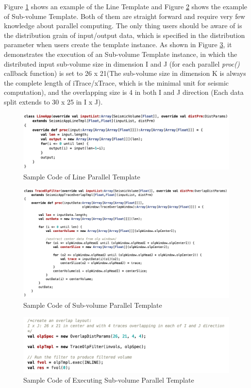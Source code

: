 Figure \ref{code_tmpl_line} shows an example of the Line Template and Figure \ref{code_tmpl_subv} shows the example of Sub-volume Template. Both of them are straight forward and require very few knowledge about parallel computing. The only thing users should be aware of is the distribution grain of input/output data, which is specified in the distribution parameter when users create the template instance. As shown in Figure \ref{code_run_subv}, it demonstrates the execution of an Sub-volume Template instance, in which the distributed input sub-volume size in dimension I and J (for each parallel \emph{proc()} callback function) is set to 26 x 21(The sub-volume size in dimension K is always the complete length of iTrace/xTrace, which is the minimal unit for seismic computation), and the overlapping size is 4 in both I and J direction (Each data split extends to 30 x 25 in I x J). 

\begin{figure}[h]
\centering
\includegraphics[scale=0.6]{figures/code_tmpl_line.png}
\caption{Sample Code of Line Parallel Template}
\label{code_tmpl_line}
\end{figure}

\begin{figure}[h]
\centering
\includegraphics[scale=0.5]{figures/code_tmpl_subv.png}
\caption{Sample Code of Sub-volume Parallel Template}
\label{code_tmpl_subv}
\end{figure}

\begin{figure}[h]
\centering
\includegraphics[scale=0.6]{figures/code_run_subv.png}
\caption{Sample Code of Executing Sub-volume Parallel Template}
\label{code_run_subv}
\end{figure}


